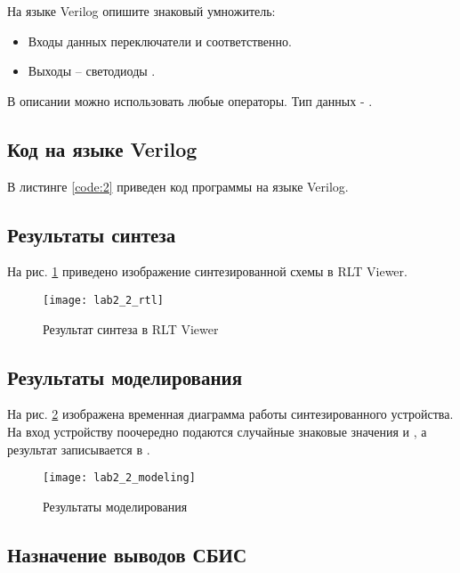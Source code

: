 На языке Verilog опишите знаковый умножитель:
\begin{itemize}
	\item Входы данных переключатели  и  соответственно.
	\item Выходы – светодиоды .
\end{itemize}

В описании можно использовать любые операторы. Тип данных - .

\subsection{Код на языке Verilog}

В листинге \ref{code:2} приведен код программы на языке Verilog.



\subsection{Результаты синтеза}

На рис. \ref{fig:lab2_2_rtl} приведено изображение синтезированной схемы в RLT Viewer.

\begin{figure}[H]
\begin{center}
	\texttt{[image: lab2\_2\_rtl]}
	\caption{Результат синтеза в RLT Viewer}
	\label{fig:lab2_2_rtl}
\end{center}
\end{figure}

\subsection{Результаты моделирования}
\label{sec:lab1_2_modeling}

На рис. \ref{fig:lab2_2_modeling} изображена временная диаграмма работы синтезированного устройства. На вход устройству поочередно подаются случайные знаковые значения  и , а результат записывается в .
\begin{figure}[H]
\begin{center}
	\texttt{[image: lab2\_2\_modeling]}
	\caption{Результаты моделирования}
	\label{fig:lab2_2_modeling}
\end{center}
\end{figure}

\subsection{Назначение выводов СБИС}

